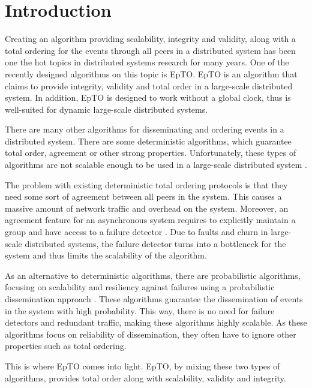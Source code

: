 \documentclass[10pt,conference,a4paper]{IEEEtran}
\begin{document}
\section{Introduction}
Creating an algorithm providing scalability, integrity and validity, along with a total ordering for the events through all peers in a distributed system has been one the hot topics in distributed systems research for many years. One of the recently designed algorithms on this topic is EpTO. EpTO is an algorithm that claims to provide integrity, validity and total order in a large-scale distributed system. In addition, EpTO is designed to work without a global clock, thus is well-suited for dynamic large-scale distributed systems.
\par 
There are many other algorithms for disseminating and ordering events in a distributed system. There are some deterministic algorithms, which guarantee total order, agreement or other strong properties. Unfortunately, these types of algorithms are not scalable enough to be used in a large-scale distributed system \autocites[]{defago2004total}[]{lamport1978time}.
\par
The problem with existing deterministic total ordering protocols is that they need some sort of agreement between all peers in the system. This causes a massive amount of network traffic and overhead on the system.
Moreover, an agreement feature for an asynchronous system requires to
explicitly maintain a group and have access to a failure detector \autocites[]{chandra1996weakest}[]{chandra1996unreliable}. Due to faults and churn in large-scale distributed systems, the failure detector turns into a bottleneck for the system and thus limits the scalability of the algorithm.
\par
As an alternative to deterministic algorithms, there are probabilistic algorithms, focusing on scalability and resiliency against failures using a probabilistic dissemination approach \autocites []{birman1999bimodal}[]{carvalho2007emergent}[]{demers1987epidemic}[]{eugster2003lightweight}[]{felber2002probabilistic}[]{hayden1996probabilistic}[]{kim2004gossip}[]{Koldehofe02simplegossiping}. These algorithms guarantee the dissemination of events in the system with high probability. This way, there is no need for failure detectors and redundant traffic, making these algorithms highly scalable. As these algorithms focus on reliability of dissemination, they often have to ignore other properties such as total ordering.
\par
This is where EpTO comes into light. EpTO, by mixing these two types of algorithms, provides total order along with scalability, validity and integrity. 
\end{document}
